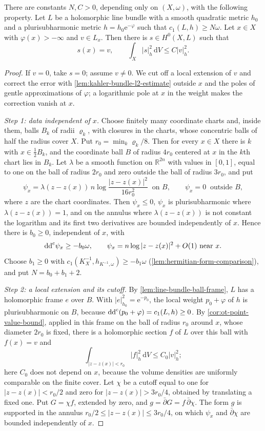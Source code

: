 \begin{theorem}\label{thm:compact-point-extension}
There are constants $N,C>0$, depending only on $(X,\omega)$, with the following property. Let $L$ be a holomorphic line bundle with a smooth quadratic metric $h_0$ and a plurisubharmonic metric $h=h_0\mathrm e^{-\varphi}$ such that $c_1(L,h)\geq N\omega$. Let $x\in X$ with $\varphi(x)>-\infty$ and $v\in L_x$. Then there is $s\in H^0(X,L)$ such that
\begin{equation}\label{eq:compact-point-extension}
 s(x)=v,\qquad
 \int_X|s|_h^2\,\mathrm dV\leq C|v|_h^2.
\end{equation}
\end{theorem}
\begin{proof}
If $v=0$, take $s=0$; assume $v\neq0$. We cut off a local extension of $v$ and correct the error with \cref{lem:kahler-bundle-l2-estimate} outside $x$ and the poles of gentle approximations of $\varphi$; a logarithmic pole at $x$ in the weight makes the correction vanish at $x$.

\emph{Step 1: data independent of $x$.} Choose finitely many coordinate charts and, inside them, balls $B_k$ of radii $\varrho_k$, with closures in the charts, whose concentric balls of half the radius cover $X$. Put $r_0=\min_k\varrho_k/8$. Then for every $x\in X$ there is $k$ with $x\in\frac12B_k$, and the coordinate ball $B$ of radius $4r_0$ centered at $x$ in the $k$th chart lies in $B_k$. Let $\lambda$ be a smooth function on $\mathbb R^{2n}$ with values in $[0,1]$, equal to one on the ball of radius $2r_0$ and zero outside the ball of radius $3r_0$, and put
\[
 \psi_x=\lambda(z-z(x))\,n\log\frac{|z-z(x)|^2}{16r_0^2}\ \text{ on }B,\qquad\psi_x=0\ \text{ outside }B,
\]
where $z$ are the chart coordinates. Then $\psi_x\leq0$, $\psi_x$ is plurisubharmonic where $\lambda(z-z(x))=1$, and on the annulus where $\lambda(z-z(x))$ is not constant the logarithm and its first two derivatives are bounded independently of $x$. Hence there is $b_0\geq0$, independent of $x$, with
\[
 \mathrm{dd}^{\mathrm{c}}\psi_x\geq-b_0\omega,
 \qquad \psi_x=n\log|z-z(x)|^2+O(1)\text{ near }x.
\]
Choose $b_1\geq0$ with $c_1(K_X^{-1},h_{K^{-1},\omega})\geq-b_1\omega$ (\cref{lem:hermitian-form-comparison}), and put $N=b_0+b_1+2$.

\emph{Step 2: a local extension and its cutoff.} By \cref{lem:line-bundle-ball-frame}, $L$ has a holomorphic frame $e$ over $B$. With $|e|_{h_0}^2=\mathrm e^{-p_0}$, the local weight $p_0+\varphi$ of $h$ is plurisubharmonic on $B$, because $\mathrm{dd}^{\mathrm{c}}(p_0+\varphi)=c_1(L,h)\geq0$. By \cref{cor:ot-point-value-bound}, applied in this frame on the ball of radius $r_0$ around $x$, whose diameter $2r_0$ is fixed, there is a holomorphic section $f$ of $L$ over this ball with $f(x)=v$ and
\[
 \int_{|z-z(x)|<r_0}|f|_h^2\,\mathrm dV\leq C_0|v|_h^2;
\]
here $C_0$ does not depend on $x$, because the volume densities are uniformly comparable on the finite cover. Let $\chi$ be a cutoff equal to one for $|z-z(x)|<r_0/2$ and zero for $|z-z(x)|>3r_0/4$, obtained by translating a fixed one. Put $G=\chi f$, extended by zero, and $g=\bar\partial G=f\,\bar\partial\chi$. The form $g$ is supported in the annulus $r_0/2\leq|z-z(x)|\leq3r_0/4$, on which $\psi_x$ and $\bar\partial\chi$ are bounded independently of $x$.


\end{proof}
